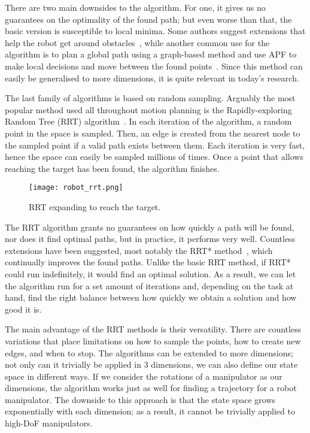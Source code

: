 There are two main downsides to the algorithm. For one, it gives us no guarantees on the optimality of the found path; but even worse than that, the basic version is susceptible to local minima. Some authors suggest extensions that help the robot get around obstacles~\cite{apf, apf2}, while another common use for the algorithm is to plan a global path using a graph-based method and use APF to make local decisions and move between the found points~\cite{hybrid}. Since this method can easily be generalised to more dimensions, it is quite relevant in today's research.

The last family of algorithms is based on random sampling. Arguably the most popular method used all throughout motion planning is the Rapidly-exploring Random Tree (RRT) algorithm~\cite{LaValle1998RapidlyexploringRT}. In each iteration of the algorithm, a random point in the space is sampled. Then, an edge is created from the nearest node to the sampled point if a valid path exists between them. Each iteration is very fast, hence the space can easily be sampled millions of times. Once a point that allows reaching the target has been found, the algorithm finishes.

\begin{figure}[h]
  \centering
  \texttt{[image: robot\_rrt.png]}
  \caption{RRT expanding to reach the target.}
\end{figure}

The RRT algorithm grants no guarantees on how quickly a path will be found, nor does it find optimal paths, but in practice, it performs very well. Countless extensions have been suggested, most notably the RRT* method~\cite{rrt_star}, which continually improves the found paths. Unlike the basic RRT method, if RRT* could run indefinitely, it would find an optimal solution. As a result, we can let the algorithm run for a set amount of iterations and, depending on the task at hand, find the right balance between how quickly we obtain a solution and how good it is.

The main advantage of the RRT methods is their versatility. There are countless variations that place limitations on how to sample the points, how to create new edges, and when to stop. The algorithms can be extended to more dimensions; not only can it trivially be applied in 3 dimensions, we can also define our state space in different ways. If we consider the rotations of a manipulator as our dimensions, the algorithm works just as well for finding a trajectory for a robot manipulator. The downside to this approach is that the state space grows exponentially with each dimension; as a result, it cannot be trivially applied to high-DoF manipulators.

